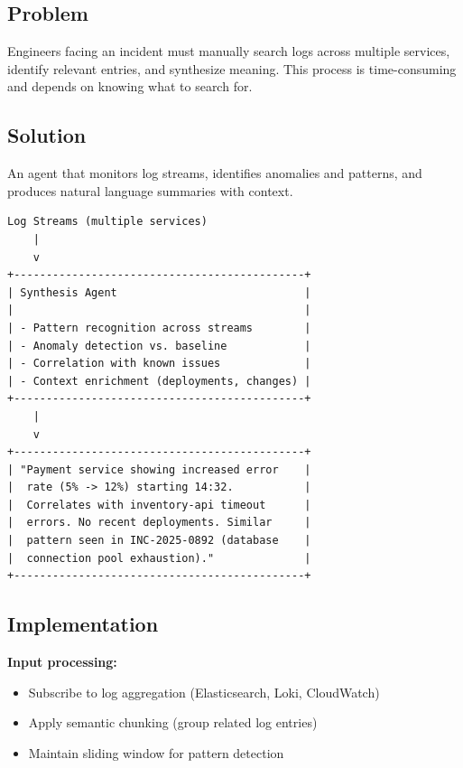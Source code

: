 \subsection{Problem}

Engineers facing an incident must manually search logs across multiple services, identify relevant entries, and synthesize meaning. This process is time-consuming and depends on knowing what to search for.

\subsection{Solution}

An agent that monitors log streams, identifies anomalies and patterns, and produces natural language summaries with context.

\begin{lstlisting}[caption={Contextual Log Synthesis Architecture}]
Log Streams (multiple services)
    |
    v
+---------------------------------------------+
| Synthesis Agent                             |
|                                             |
| - Pattern recognition across streams        |
| - Anomaly detection vs. baseline            |
| - Correlation with known issues             |
| - Context enrichment (deployments, changes) |
+---------------------------------------------+
    |
    v
+---------------------------------------------+
| "Payment service showing increased error    |
|  rate (5% -> 12%) starting 14:32.           |
|  Correlates with inventory-api timeout      |
|  errors. No recent deployments. Similar     |
|  pattern seen in INC-2025-0892 (database    |
|  connection pool exhaustion)."              |
+---------------------------------------------+
\end{lstlisting}

\subsection{Implementation}

\textbf{Input processing:}
\begin{itemize}
    \item Subscribe to log aggregation (Elasticsearch, Loki, CloudWatch)
    \item Apply semantic chunking (group related log entries)
    \item Maintain sliding window for pattern detection
\end{itemize}

